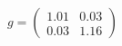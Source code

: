 \documentclass[preview]{standalone}
\begin{document}
\begin{align*}
g = \begin{pmatrix} 1.01 & 0.03 \\ 0.03 & 1.16 \end{pmatrix}
\end{align*}
\end{document}
